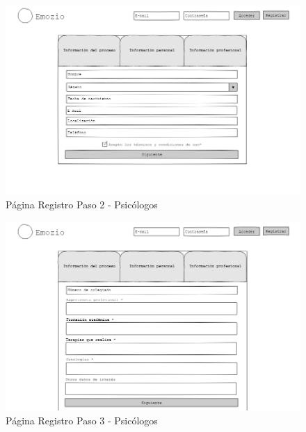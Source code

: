 \begin{figure}[htbp] 
    \centering
    \includegraphics[width=1\textwidth]{figuras/mockup_psicologos/registro2.png}
    \caption{Página Registro Paso 2 - Psicólogos}
\end{figure}	

\begin{figure}[htbp] 
    \centering
    \includegraphics[width=1\textwidth]{figuras/mockup_psicologos/registro3.png}
    \caption{Página Registro Paso 3 - Psicólogos}
\end{figure}	



